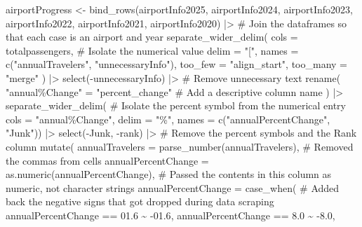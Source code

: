 \documentclass[
  letterpaper,
  DIV=11,
  numbers=noendperiod]{scrartcl}
\newenvironment{Shaded}{\begin{snugshade}}{\end{snugshade}}
\newcommand{\AttributeTok}[1]{\textcolor[rgb]{0.40,0.45,0.13}{#1}}
\newcommand{\CommentTok}[1]{\textcolor[rgb]{0.37,0.37,0.37}{#1}}
\newcommand{\FloatTok}[1]{\textcolor[rgb]{0.68,0.00,0.00}{#1}}
\newcommand{\FunctionTok}[1]{\textcolor[rgb]{0.28,0.35,0.67}{#1}}
\newcommand{\NormalTok}[1]{\textcolor[rgb]{0.00,0.23,0.31}{#1}}
\newcommand{\OtherTok}[1]{\textcolor[rgb]{0.00,0.23,0.31}{#1}}
\newcommand{\SpecialCharTok}[1]{\textcolor[rgb]{0.37,0.37,0.37}{#1}}
\newcommand{\StringTok}[1]{\textcolor[rgb]{0.13,0.47,0.30}{#1}}
\begin{document}
\begin{Shaded}
\begin{Highlighting}[]
\NormalTok{airportProgress }\OtherTok{\textless{}{-}} \FunctionTok{bind\_rows}\NormalTok{(airportInfo2025, airportInfo2024, }
\NormalTok{                             airportInfo2023, airportInfo2022, airportInfo2021, airportInfo2020) }\SpecialCharTok{|\textgreater{}} \CommentTok{\# Join the dataframes so that each case is an airport and year }
  \FunctionTok{separate\_wider\_delim}\NormalTok{( }
    \AttributeTok{cols =}\NormalTok{ totalpassengers, }\CommentTok{\# Isolate the numerical value }
    \AttributeTok{delim =} \StringTok{"["}\NormalTok{,}
    \AttributeTok{names =} \FunctionTok{c}\NormalTok{(}\StringTok{"annualTravelers"}\NormalTok{, }\StringTok{"unnecessaryInfo"}\NormalTok{),}
    \AttributeTok{too\_few =} \StringTok{"align\_start"}\NormalTok{,}
    \AttributeTok{too\_many =} \StringTok{"merge"}
\NormalTok{  ) }\SpecialCharTok{|\textgreater{}}
  \FunctionTok{select}\NormalTok{(}\SpecialCharTok{{-}}\NormalTok{unnecessaryInfo) }\SpecialCharTok{|\textgreater{}} \CommentTok{\# Remove unnecessary text}
  \FunctionTok{rename}\NormalTok{(}
    \StringTok{"annual\%Change"} \OtherTok{=} \StringTok{"percent\_change"} \CommentTok{\# Add a descriptive column name}
\NormalTok{  ) }\SpecialCharTok{|\textgreater{}}
  \FunctionTok{separate\_wider\_delim}\NormalTok{( }\CommentTok{\# Isolate the percent symbol from the numerical entry}
    \AttributeTok{cols =} \StringTok{"annual\%Change"}\NormalTok{,}
    \AttributeTok{delim =} \StringTok{"\%"}\NormalTok{,}
    \AttributeTok{names =} \FunctionTok{c}\NormalTok{(}\StringTok{"annualPercentChange"}\NormalTok{, }\StringTok{"Junk"}\NormalTok{)) }\SpecialCharTok{|\textgreater{}}
  \FunctionTok{select}\NormalTok{(}\SpecialCharTok{{-}}\NormalTok{Junk, }\SpecialCharTok{{-}}\NormalTok{rank) }\SpecialCharTok{|\textgreater{}} \CommentTok{\# Remove the percent symbols and the Rank column}
  \FunctionTok{mutate}\NormalTok{(}
    \AttributeTok{annualTravelers =} \FunctionTok{parse\_number}\NormalTok{(annualTravelers),}
    \CommentTok{\# Removed the commas from cells}
    \AttributeTok{annualPercentChange =} \FunctionTok{as.numeric}\NormalTok{(annualPercentChange), }
    \CommentTok{\# Passed the contents in this column as numeric, not character strings}
    \AttributeTok{annualPercentChange =} \FunctionTok{case\_when}\NormalTok{( }
      \CommentTok{\# Added back the negative signs that got dropped during data scraping }
\NormalTok{      annualPercentChange }\SpecialCharTok{==} \FloatTok{01.6} \SpecialCharTok{\textasciitilde{}} \SpecialCharTok{{-}}\FloatTok{01.6}\NormalTok{,}
\NormalTok{      annualPercentChange }\SpecialCharTok{==} \FloatTok{8.0} \SpecialCharTok{\textasciitilde{}} \SpecialCharTok{{-}}\FloatTok{8.0}\NormalTok{,}

\end{Highlighting}
\end{Shaded}
\end{document}
